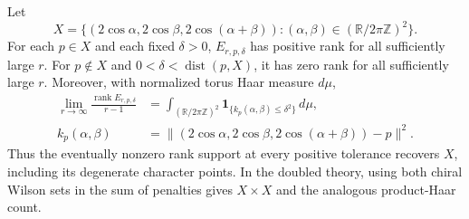 \begin{theorem}
\label{thm:tw-torus-joint-wilson}
Let
\[
 X=\{(2\cos\alpha,2\cos\beta,2\cos(\alpha+\beta)):
                 (\alpha,\beta)\in(\mathbb R/2\pi\mathbb Z)^2\}.
\]
For each \(p\in X\) and each fixed \(\delta>0\), \(E_{r,p,\delta}\) has
positive rank for all sufficiently large \(r\).  For
\(p\notin X\) and \(0<\delta<\operatorname{dist}(p,X)\), it has zero rank
for all sufficiently large \(r\).  Moreover, with normalized torus Haar
measure \(d\mu\),
\begin{equation}
 \begin{aligned}
 \lim_{r\to\infty}\frac{\operatorname{rank}E_{r,p,\delta}}{r-1}
   &=\int_{(\mathbb R/2\pi\mathbb Z)^2}
     \boldsymbol{1}_{\{k_p(\alpha,\beta)\leq\delta^2\}}\,d\mu,\\
 k_p(\alpha,\beta)
   &=\big\|(2\cos\alpha,2\cos\beta,2\cos(\alpha+\beta))-p\big\|^2 .
 \end{aligned}
 \label{eq:tw-torus-count}
\end{equation}
Thus the eventually nonzero rank support at every positive tolerance
recovers \(X\), including its degenerate character points.  In the
doubled theory, using both chiral Wilson sets in the sum of penalties
gives \(X\times X\) and the analogous product-Haar count.
\end{theorem}


